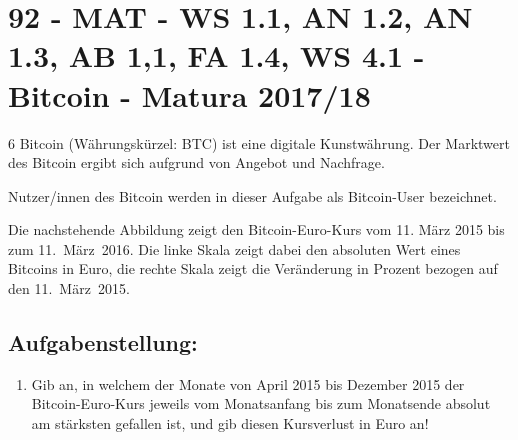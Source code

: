 \section{92 - MAT - WS 1.1, AN 1.2, AN 1.3, AB 1,1, FA 1.4, WS 4.1  - Bitcoin - Matura 2017/18}

\begin{langesbeispiel} \item[6] %
			Bitcoin (Währungskürzel: BTC) ist eine digitale Kunstwährung. Der Marktwert des Bitcoin ergibt sich aufgrund von Angebot und Nachfrage.
			
Nutzer/innen des Bitcoin werden in dieser Aufgabe als Bitcoin-User bezeichnet.

Die nachstehende Abbildung zeigt den Bitcoin-Euro-Kurs vom 11. März 2015 bis zum 11. März 2016. Die linke Skala zeigt dabei den absoluten Wert eines Bitcoins in Euro, die rechte Skala zeigt die Veränderung in Prozent bezogen auf den 11. März 2015.

\begin{center}
\end{center}

\subsection{Aufgabenstellung:}
\begin{enumerate}
	\item Gib an, in welchem der Monate von April 2015 bis Dezember 2015 der Bitcoin-Euro-Kurs jeweils vom Monatsanfang bis zum Monatsende absolut am stärksten gefallen ist, und gib diesen Kursverlust in Euro an!\leer
	

\end{enumerate}
\end{langesbeispiel}
